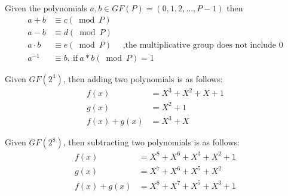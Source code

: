\begin{rem} Given the polynomials $a,b \in  GF(P) = (0,1,2,...,P-1)$ then 
\begin{align*} 		
		a + b &\equiv c (\bmod P)\\
		a - b &\equiv d (\bmod P)\\
		a \cdot b &\equiv e (\bmod P) \quad \text{ ,the multiplicative group does not include 0}\\
		a^{-1} &\equiv b, \mathrm{~if~} a * b (\bmod P) = 1
\end{align*}
\end{rem}	
\begin{eg} Given $GF(2^4)$, then adding two polynomials is as follows:
\begin{align*}
	f(x) &= X^3 + X^2 + X + 1\\
	g(x) &= X^2  + 1\\
           f(x) + g(x) &= X^3  + X
\end{align*}
\end{eg}

\begin{eg} Given $GF(2^8)$, then subtracting two polynomials is as follows:
\begin{align*}	
	f(x) &= X^8 +         X^6 +          X^3 + X^2 + 1\\
	g(x) &=        X^7 + X^6 + X^5 +          X^2\\
 f(x) + g(x) &= X^8 + X^7 +        X^5  + X^3  +         1
\end{align*}
\\
\end{eg}

